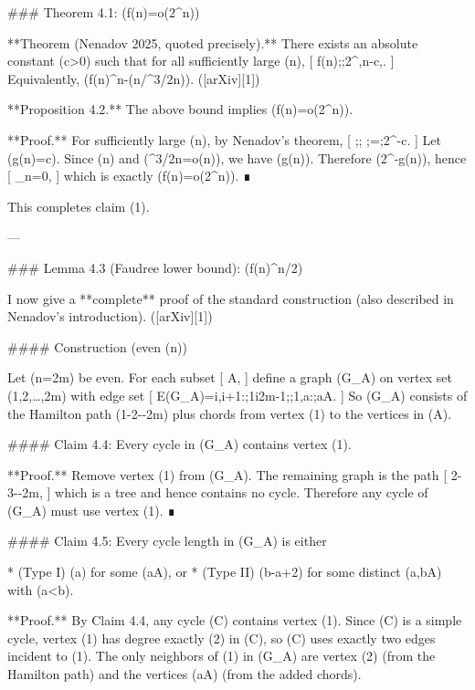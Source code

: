 ### Theorem 4.1: (f(n)=o(2^n))

**Theorem (Nenadov 2025, quoted precisely).**
There exists an absolute constant (c>0) such that for all sufficiently large (n),
[
f(n);\le;2^{,n-c,}.
]
Equivalently, (f(n)^{n-\Omega(\sqrt n/\log^{3/2}n)}). ([arXiv][1])

**Proposition 4.2.** The above bound implies (f(n)=o(2^n)).

**Proof.** For sufficiently large (n), by Nenadov’s theorem,
[
;\le;
;=;2^{-c}.
]
Let (g(n)=c). Since (\sqrt n\to\infty) and (\log^{3/2}n=o(\sqrt n)), we have (g(n)\to\infty). Therefore (2^{-g(n)}), hence
[
\lim_{n\to\infty}=0,
]
which is exactly (f(n)=o(2^n)). ∎

This completes claim (1).

---

### Lemma 4.3 (Faudree lower bound): (f(n)^{\lfloor n/2\rfloor})

I now give a **complete** proof of the standard construction (also described in Nenadov’s introduction). ([arXiv][1])

#### Construction (even (n))

Let (n=2m) be even. For each subset
[
A,
]
define a graph (G_A) on vertex set ({1,2,\dots,2m}) with edge set
[
E(G_A)={{i,i+1}:;1\le i\le 2m-1};\cup;{{1,a}:;a\in A}.
]
So (G_A) consists of the Hamilton path (1-2-\cdots-2m) plus chords from vertex (1) to the vertices in (A).

#### Claim 4.4: Every cycle in (G_A) contains vertex (1).

**Proof.** Remove vertex (1) from (G_A). The remaining graph is the path
[
2-3-\cdots-2m,
]
which is a tree and hence contains no cycle. Therefore any cycle of (G_A) must use vertex (1). ∎

#### Claim 4.5: Every cycle length in (G_A) is either

* (Type I) (a) for some (a\in A), or
* (Type II) (b-a+2) for some distinct (a,b\in A) with (a<b).

**Proof.** By Claim 4.4, any cycle (C) contains vertex (1). Since (C) is a simple cycle, vertex (1) has degree exactly (2) in (C), so (C) uses exactly two edges incident to (1). The only neighbors of (1) in (G_A) are vertex (2) (from the Hamilton path) and the vertices (a\in A) (from the added chords).


